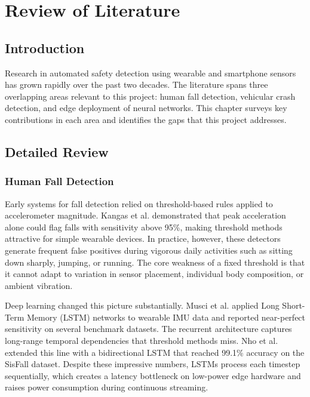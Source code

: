 \chapter{Review of Literature}
\label{sec:2}

\section{Introduction}
\label{sec:lit_intro}

Research in automated safety detection using wearable and smartphone sensors has grown rapidly over the past two decades. The literature spans three overlapping areas relevant to this project: human fall detection, vehicular crash detection, and edge deployment of neural networks. This chapter surveys key contributions in each area and identifies the gaps that this project addresses.

\section{Detailed Review}
\label{sec:lit_detailed}

\subsection{Human Fall Detection}

Early systems for fall detection relied on threshold-based rules applied to accelerometer magnitude. Kangas et al. \citep{kangas2008} demonstrated that peak acceleration alone could flag falls with sensitivity above 95\%, making threshold methods attractive for simple wearable devices. In practice, however, these detectors generate frequent false positives during vigorous daily activities such as sitting down sharply, jumping, or running. The core weakness of a fixed threshold is that it cannot adapt to variation in sensor placement, individual body composition, or ambient vibration.

Deep learning changed this picture substantially. Musci et al. \citep{musci2020} applied Long Short-Term Memory (LSTM) networks to wearable IMU data and reported near-perfect sensitivity on several benchmark datasets. The recurrent architecture captures long-range temporal dependencies that threshold methods miss. Nho et al. \citep{nho2021} extended this line with a bidirectional LSTM that reached 99.1\% accuracy on the SisFall dataset. Despite these impressive numbers, LSTMs process each timestep sequentially, which creates a latency bottleneck on low-power edge hardware and raises power consumption during continuous streaming.

